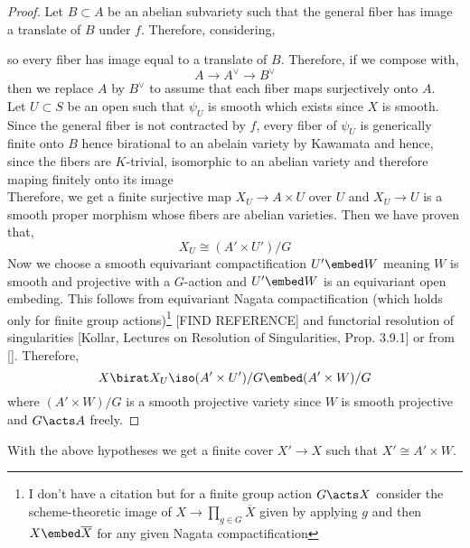 \documentclass[12pt]{article}
\begin{document}
\begin{proof}
Let $B \subset A$ be an abelian subvariety such that the general fiber has image a translate of $B$ under $f$. Therefore, considering,
\begin{center}
\end{center}
so every fiber has image equal to a translate of $B$. Therefore, if we compose with,
\[ A \to A^\vee \to B^\vee \]
then we replace $A$ by $B^\vee$ to assume that each fiber maps surjectively onto $A$.
\bigskip\\
Let $U \subset S$ be an open such that $\psi_U$ is smooth which exists since $X$ is smooth. Since the general fiber is not contracted by $f$, every fiber of $\psi_U$ is generically finite onto $B$ hence birational to an abelain variety by Kawamata and hence, since the fibers are $K$-trivial, isomorphic to an abelian variety and therefore maping finitely onto its image
\bigskip\\
Therefore, we get a finite surjective map $X_U \to A \times U$ over $U$ and $X_U \to U$ is a smooth proper morphism whose fibers are abelian varieties. Then we have proven that,
\[ X_U \cong (A' \times U') / G \]
Now we choose a smooth equivariant compactification $U' \embed W$ meaning $W$ is smooth and projective with a $G$-action and $U' \embed W$ is an equivariant open embeding. This follows from equivariant Nagata compactification (which holds only for finite group actions)\footnote{I don't have a citation but for a finite group action $G \acts X$ consider the scheme-theoretic image of $X \to \prod_{g \in G} \overline{X}$ given by applying $g$ and then $X \embed \overline{X}$ for any given Nagata compactification} [FIND REFERENCE] and functorial resolution of singularities [Kollar, Lectures on Resolution of Singularities, Prop. 3.9.1] or from []. Therefore,
\[ X \birat X_U \iso (A' \times U')/G \embed (A' \times W)/G \]
where $(A' \times W)/G$ is a smooth projective variety since $W$ is smooth projective and $G \acts A$ freely. 
\end{proof}

\begin{cor}
With the above hypotheses we get a finite \etale cover $X' \to X$ such that $X' \cong A' \times W$.
\end{cor}
\end{document}
